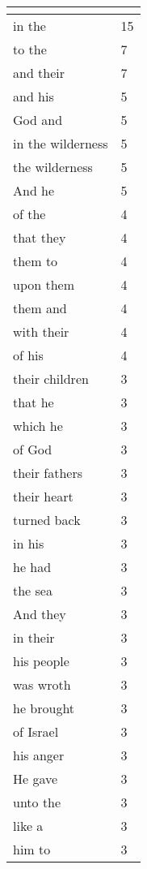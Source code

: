 \begin{center}
\begin{longtable}{|p{3.0in}|p{0.5in}|}
\hline \multicolumn{2}{c}{{ }} \\ \hline
\endfoot 
in the & 15\\ \hline 
to the & 7\\ \hline 
and their & 7\\ \hline 
and his & 5\\ \hline 
God and & 5\\ \hline 
in the wilderness & 5\\ \hline 
the wilderness & 5\\ \hline 
And he & 5\\ \hline 
of the & 4\\ \hline 
that they & 4\\ \hline 
them to & 4\\ \hline 
upon them & 4\\ \hline 
them and & 4\\ \hline 
with their & 4\\ \hline 
of his & 4\\ \hline 
their children & 3\\ \hline 
that he & 3\\ \hline 
which he & 3\\ \hline 
of God & 3\\ \hline 
their fathers & 3\\ \hline 
their heart & 3\\ \hline 
turned back & 3\\ \hline 
in his & 3\\ \hline 
he had & 3\\ \hline 
the sea & 3\\ \hline 
And they & 3\\ \hline 
in their & 3\\ \hline 
his people & 3\\ \hline 
was wroth & 3\\ \hline 
he brought & 3\\ \hline 
of Israel & 3\\ \hline 
his anger & 3\\ \hline 
He gave & 3\\ \hline 
unto the & 3\\ \hline 
like a & 3\\ \hline 
him to & 3\\ \hline 
\end{longtable}
\end{center}





